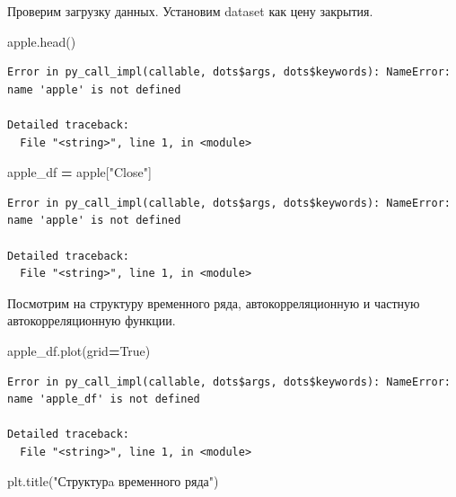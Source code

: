 \documentclass[]{book}
\newenvironment{Shaded}{\begin{snugshade}}{\end{snugshade}}
\newcommand{\NormalTok}[1]{#1}
\newcommand{\OperatorTok}[1]{\textcolor[rgb]{0.81,0.36,0.00}{\textbf{#1}}}
\newcommand{\StringTok}[1]{\textcolor[rgb]{0.31,0.60,0.02}{#1}}
\newcommand{\VariableTok}[1]{\textcolor[rgb]{0.00,0.00,0.00}{#1}}
\begin{document}
Проверим загрузку данных. Установим dataset как цену закрытия.

\begin{Shaded}
\begin{Highlighting}[]
\NormalTok{apple.head()}
\end{Highlighting}
\end{Shaded}

\begin{verbatim}
Error in py_call_impl(callable, dots$args, dots$keywords): NameError: name 'apple' is not defined

Detailed traceback: 
  File "<string>", line 1, in <module>
\end{verbatim}

\begin{Shaded}
\begin{Highlighting}[]
\NormalTok{apple_df }\OperatorTok{=}\NormalTok{ apple[}\StringTok{"Close"}\NormalTok{]}
\end{Highlighting}
\end{Shaded}

\begin{verbatim}
Error in py_call_impl(callable, dots$args, dots$keywords): NameError: name 'apple' is not defined

Detailed traceback: 
  File "<string>", line 1, in <module>
\end{verbatim}

Посмотрим на структуру временного ряда, автокорреляционную и частную автокорреляционную функции.

\begin{Shaded}
\begin{Highlighting}[]
\NormalTok{apple_df.plot(grid}\OperatorTok{=}\VariableTok{True}\NormalTok{)}
\end{Highlighting}
\end{Shaded}

\begin{verbatim}
Error in py_call_impl(callable, dots$args, dots$keywords): NameError: name 'apple_df' is not defined

Detailed traceback: 
  File "<string>", line 1, in <module>
\end{verbatim}

\begin{Shaded}
\begin{Highlighting}[]
\NormalTok{plt.title(}\StringTok{"Структурa временного ряда"}\NormalTok{)}
\end{Highlighting}
\end{Shaded}
\end{document}
